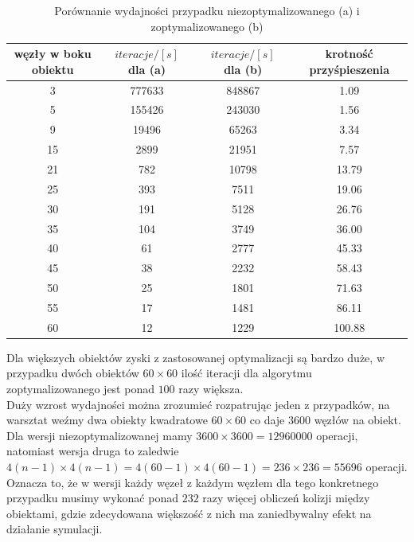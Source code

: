\documentclass[12pt, letterpaper]{report}
\begin{document}
    \begin{table}[H]
        \centering
        \begin{tabular}{||c c c c||} 
            \hline
            węzły w boku obiektu & $iteracje / [s]$ dla (a) & $iteracje / [s]$ dla (b) & krotność przyśpieszenia \\ [0.5ex] 
            \hline\hline
            3 & 777633 & 848867 & 1.09 \\ 
            \hline
            5 & 155426 & 243030 & 1.56 \\
            \hline
            9 & 19496 & 65263 & 3.34 \\
            \hline
            15 & 2899 & 21951 & 7.57 \\
            \hline
            21 & 782 & 10798 & 13.79 \\
            \hline
            25 & 393 & 7511 & 19.06 \\
            \hline
            30 & 191 & 5128 & 26.76 \\
            \hline
            35 & 104 & 3749 & 36.00 \\
            \hline
            40 & 61 & 2777 & 45.33 \\ 
            \hline
            45 & 38 & 2232 & 58.43 \\ 
            \hline
            50 & 25 & 1801 & 71.63 \\
            \hline
            55 & 17 & 1481 & 86.11 \\ 
            \hline
            60 & 12 & 1229 & 100.88 \\ [1ex] 
            \hline
        \end{tabular}
        \caption{ Porównanie wydajności przypadku niezoptymalizowanego (a) i zoptymalizowanego (b) }
    \end{table}
    Dla większych obiektów zyski z zastosowanej optymalizacji są bardzo duże, w przypadku dwóch obiektów
    $60 \times 60$ ilość iteracji dla algorytmu zoptymalizowanego jest ponad $100$ razy większa. \\

    Duży wzrost wydajności można zrozumieć rozpatrując jeden z przypadków, na warsztat weźmy dwa 
    obiekty kwadratowe $60 \times 60$ co daje $3600$ węzłów na obiekt.
    Dla wersji niezoptymalizowanej mamy $3600 \times 3600 = 12960000$ operacji, natomiast wersja druga to zaledwie
    $4(n - 1) \times 4(n - 1) = 4(60 - 1) \times 4(60 - 1) = 236 \times 236 = 55696$ operacji. Oznacza to, że 
    w wersji każdy węzeł z każdym węzłem dla tego konkretnego przypadku musimy wykonać ponad $232$ razy więcej obliczeń
    kolizji między obiektami, gdzie zdecydowana większość z nich ma zaniedbywalny efekt na działanie symulacji. \\
\end{document}

